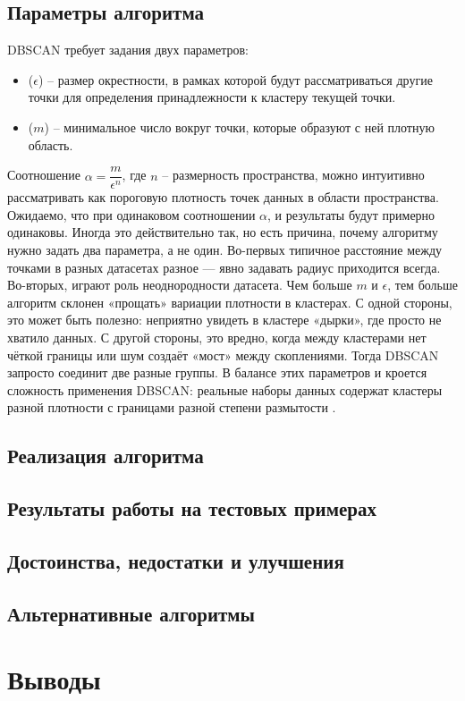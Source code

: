 \subsection{Параметры алгоритма }

DBSCAN требует задания двух параметров:

\begin{itemize}
	\item {} ($\epsilon$) -- размер окрестности, в рамках которой будут рассматриваться другие точки для определения принадлежности к кластеру текущей точки.
	\item {} ($m$) -- минимальное число вокруг точки, которые образуют с ней плотную область.
\end{itemize}

Соотношение $\alpha = \dfrac{m}{\epsilon^n}$, где $n$ -- размерность пространства, можно интуитивно рассматривать как пороговую плотность точек данных в области пространства. Ожидаемо, что при одинаковом соотношении $\alpha$, и результаты будут примерно одинаковы. Иногда это действительно так, но есть причина, почему алгоритму нужно задать два параметра, а не один. Во-первых типичное расстояние между точками в разных датасетах разное — явно задавать радиус приходится всегда. Во-вторых, играют роль неоднородности датасета. Чем больше $m$ и $\epsilon$, тем больше алгоритм склонен «прощать» вариации плотности в кластерах. С одной стороны, это может быть полезно: неприятно увидеть в кластере «дырки», где просто не хватило данных. С другой стороны, это вредно, когда между кластерами нет чёткой границы или шум создаёт «мост» между скоплениями. Тогда DBSCAN запросто соединит две разные группы. В балансе этих параметров и кроется сложность применения DBSCAN: реальные наборы данных содержат кластеры разной плотности с границами разной степени размытости \cite{habr}.

\subsection{Реализация алгоритма}

\subsection{Результаты работы на тестовых примерах}

\subsection{Достоинства, недостатки и улучшения}

\subsection{Альтернативные алгоритмы}

\section{Выводы}





